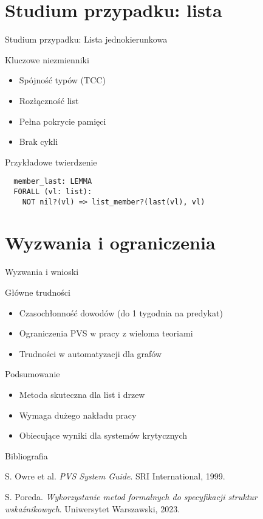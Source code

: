 \documentclass{beamer}
\begin{document}
\section{Studium przypadku: lista}
\begin{frame}[fragile]{Studium przypadku: Lista jednokierunkowa}
\begin{block}{Kluczowe niezmienniki}
\begin{itemize}
\item Spójność typów (TCC)
\item Rozłączność list
\item Pełna pokrycie pamięci
\item Brak cykli
\end{itemize}
\end{block}

\begin{exampleblock}{Przykładowe twierdzenie}
\begin{verbatim}
  member_last: LEMMA 
  FORALL (vl: list): 
    NOT nil?(vl) => list_member?(last(vl), vl)
\end{verbatim}
\end{exampleblock}
\end{frame}

\section{Wyzwania i ograniczenia}
\begin{frame}{Wyzwania i wnioski}
\begin{alertblock}{Główne trudności}
\begin{itemize}
\item Czasochłonność dowodów (do 1 tygodnia na predykat)
\item Ograniczenia PVS w pracy z wieloma teoriami
\item Trudności w automatyzacji dla grafów
\end{itemize}
\end{alertblock}

\begin{block}{Podsumowanie}
\begin{itemize}
\item Metoda skuteczna dla list i drzew
\item Wymaga dużego nakładu pracy
\item Obiecujące wyniki dla systemów krytycznych
\end{itemize}
\end{block}
\end{frame}

\begin{frame}{Bibliografia}
\begin{thebibliography}{9}
S. Owre et al. 
\emph{PVS System Guide}. 
SRI International, 1999.

S. Poreda. 
\emph{Wykorzystanie metod formalnych do specyfikacji struktur wskaźnikowych}. 
Uniwersytet Warszawski, 2023.
\end{thebibliography}
\end{frame}
\end{document}
